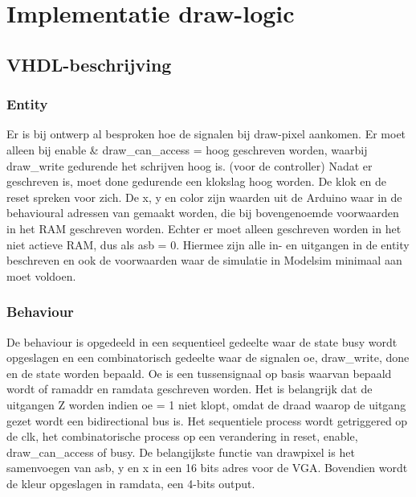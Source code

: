 \documentclass{scrreprt} %
\date{22 november 2013}
\begin{document}
\chapter{Implementatie draw-logic}

\section{VHDL-beschrijving}
\subsection{Entity}
Er is bij ontwerp al besproken hoe de signalen bij draw-pixel aankomen. Er moet alleen bij enable \& draw\_can\_access = hoog geschreven worden, waarbij draw\_write gedurende het schrijven hoog is. (voor de controller)  Nadat er geschreven is, moet done gedurende een klokslag hoog worden. De klok en de reset spreken voor zich. De x, y en color zijn waarden uit de Arduino waar in de behavioural adressen van gemaakt worden, die bij bovengenoemde voorwaarden in het RAM geschreven worden. Echter er moet alleen geschreven worden in het niet actieve RAM, dus als asb = 0.  Hiermee zijn alle in- en uitgangen in de entity beschreven en ook de voorwaarden waar de simulatie in Modelsim minimaal aan moet voldoen. 

\subsection{Behaviour}
De behaviour is opgedeeld in een sequentieel gedeelte waar de state busy wordt opgeslagen en een combinatorisch gedeelte waar de signalen oe, draw\_write, done en de state worden bepaald. Oe is een tussensignaal op basis waarvan bepaald wordt of ramaddr en ramdata geschreven worden. Het is belangrijk dat de uitgangen Z worden indien oe = 1 niet klopt, omdat de draad waarop de uitgang gezet wordt een bidirectional bus is. Het sequentiele process wordt getriggered op de clk, het combinatorische process op een verandering in reset, enable, draw\_can\_access of busy. De belangijkste functie
van drawpixel is het samenvoegen van asb, y en x in een 16 bits adres voor de VGA. Bovendien wordt de kleur opgeslagen in ramdata, een 4-bits output. 
\end{document}
